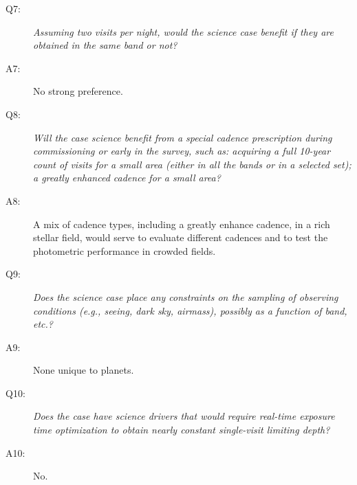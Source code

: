 \begin{description}
%
 \item[Q7:] {\it Assuming two visits per night, would the science case
 benefit if they are obtained in the same band or not?}
%
 \item[A7:] No strong preference.
%
 \item[Q8:] {\it Will the case science benefit from a special cadence
prescription during commissioning or early in the survey, such as:
 acquiring a full 10-year count of visits for a small area (either in all
 the bands or in a  selected set); a greatly enhanced cadence for a small
 area?}
%
 \item[A8:] A mix of cadence types, including a greatly enhance cadence, in a rich stellar field, would serve to evaluate
different cadences and to test the photometric performance in crowded fields.
%
 \item[Q9:] {\it Does the science case place any constraints on the
 sampling of observing conditions (e.g., seeing, dark sky, airmass),
 possibly as a function of band, etc.?}
%
 \item[A9:] None unique to planets.
%
 \item[Q10:] {\it Does the case have science drivers that would require
 real-time exposure time optimization to obtain nearly constant
 single-visit limiting depth?}
%
 \item[A10:] No.
%
 \end{description}
%

\navigationbar
